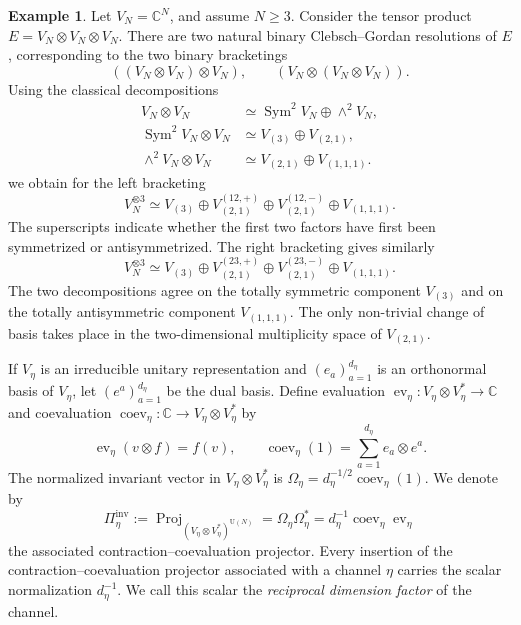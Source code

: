 \documentclass[11pt,a4paper,reqno]{amsart}
\theoremstyle{definition}
\newtheorem{example}[theorem]{Example}
\theoremstyle{remark}
\newcommand\U{{\mathrm U}}
\begin{document}
\begin{example}\label{ex:CG-resolution}
\label{ex:first-change-of-bracketing}
Let $V_N=\mathbb C^N$, and assume $N\geq 3$. Consider the tensor product $E=V_N\otimes V_N\otimes V_N$. There are two natural binary Clebsch--Gordan resolutions of $E$, corresponding to the two binary bracketings
\[
((V_N\otimes V_N)\otimes V_N),\qquad (V_N\otimes (V_N\otimes V_N)).
\]
Using the classical decompositions
\[
\begin{aligned}
V_N\otimes V_N
&\simeq \operatorname{Sym}^2V_N\oplus \wedge^2V_N,\\
\operatorname{Sym}^2V_N\otimes V_N
&\simeq V_{(3)}\oplus V_{(2,1)},\\
\wedge^2V_N\otimes V_N
&\simeq V_{(2,1)}\oplus V_{(1,1,1)}.
\end{aligned}
\]
we obtain for the left bracketing
\[
V_N^{\otimes3}\simeq V_{(3)}\oplus V_{(2,1)}^{(12,+)}\oplus V_{(2,1)}^{(12,-)}\oplus V_{(1,1,1)}.
\]
The superscripts indicate whether the first two factors have first been symmetrized or antisymmetrized. The right bracketing gives similarly
\[
V_N^{\otimes3}\simeq V_{(3)}\oplus V_{(2,1)}^{(23,+)}\oplus V_{(2,1)}^{(23,-)}\oplus V_{(1,1,1)}.
\]
The two decompositions agree on the totally symmetric component $V_{(3)}$ and on the totally antisymmetric component $V_{(1,1,1)}$. The only non-trivial change of basis takes place in the two-dimensional multiplicity space of $V_{(2,1)}$.
\end{example}

If $V_\eta$ is an irreducible unitary representation and $(e_a)_{a=1}^{d_\eta}$ is an orthonormal basis of $V_\eta$, let $(e^a)_{a=1}^{d_\eta}$ be the dual basis. Define evaluation $\operatorname{ev}_\eta:V_\eta\otimes V_\eta^*\to\mathbb C$ and coevaluation $\operatorname{coev}_\eta:\mathbb C\to V_\eta\otimes V_\eta^*$ by
\[
\operatorname{ev}_\eta(v\otimes f)=f(v),\qquad\operatorname{coev}_\eta(1)=\sum_{a=1}^{d_\eta}e_a\otimes e^a.
\]
The normalized invariant vector in $V_\eta\otimes V_\eta^*$ is $\Omega_\eta=d_\eta^{-1/2}\operatorname{coev}_\eta(1)$. We denote by
\begin{equation}\label{eq:contraction-coevaluation-projector}
\Pi^{\operatorname{inv}}_\eta
:=\operatorname{Proj}_{(V_\eta\otimes V_\eta^*)^{\U(N)}}
=\Omega_\eta\Omega_\eta^*
=d_\eta^{-1}\operatorname{coev}_\eta\operatorname{ev}_\eta
\end{equation}
the associated contraction--coevaluation projector. Every insertion of the contraction--coevaluation projector associated with a channel $\eta$ carries the scalar normalization $d_\eta^{-1}$. We call this scalar the \emph{reciprocal dimension factor} of the channel.
\end{document}
